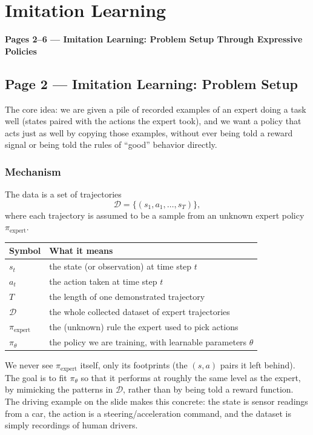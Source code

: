 \section{Imitation Learning}

\bigskip

\textbf{Pages 2--6 --- Imitation Learning: Problem Setup Through Expressive Policies}

\subsection*{Page 2 --- Imitation Learning: Problem Setup}

The core idea: we are given a pile of recorded examples of an expert doing a task well (states paired with the actions the expert took), and we want a policy that acts just as well by copying those examples, without ever being told a reward signal or being told the rules of ``good'' behavior directly.

\subsubsection*{Mechanism}

The data is a set of trajectories
\[
\mathcal{D} = \{(s_1, a_1, \dots, s_T)\},
\]
where each trajectory is assumed to be a sample from an unknown expert policy $\pi_{\text{expert}}$.

\begin{center}
\begin{tabular}{@{}ll@{}}
\toprule
Symbol & What it means \\
\midrule
$s_t$ & the state (or observation) at time step $t$ \\
$a_t$ & the action taken at time step $t$ \\
$T$ & the length of one demonstrated trajectory \\
$\mathcal{D}$ & the whole collected dataset of expert trajectories \\
$\pi_{\text{expert}}$ & the (unknown) rule the expert used to pick actions \\
$\pi_\theta$ & the policy we are training, with learnable parameters $\theta$ \\
\bottomrule
\end{tabular}
\end{center}

We never see $\pi_{\text{expert}}$ itself, only its footprints (the $(s,a)$ pairs it left behind). The goal is to fit $\pi_\theta$ so that it performs at roughly the same level as the expert, by mimicking the patterns in $\mathcal{D}$, rather than by being told a reward function. The driving example on the slide makes this concrete: the state is sensor readings from a car, the action is a steering/acceleration command, and the dataset is simply recordings of human drivers.

